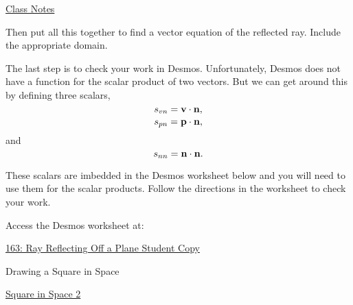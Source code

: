 \documentclass{ximera}
\begin{document}
\begin{question}
\href{https://ximera.osu.edu/calc3/Calculus3/ScalarProduct/ScalarProduct}{Class Notes}

Then put all this together to find a vector equation of the reflected ray. Include the appropriate domain.

The last step is to check your work in Desmos. Unfortunately, Desmos does not have a function for the scalar product of two vectors. But we can get around this by defining three scalars,
\[
    s_{vn} = {\bf v}\cdot {\bf n} ,
\]
\[
    s_{pn} =  {\bf p}\cdot {\bf n},
\]
and 
\[
       s_{nn} =  {\bf n}\cdot {\bf n} .
\]

These scalars are imbedded in the Desmos worksheet below and you will need to use them for the scalar products. Follow the directions in the worksheet to check your work. 


Access the Desmos worksheet at:

\href{https://www.desmos.com/3d/85f82721d5}{163: Ray Reflecting Off a Plane Student Copy}



\end{question}



Drawing a Square in Space

\href{https://www.desmos.com/3d/3a19b63ef0}{Square in Space 2}
\end{document}
